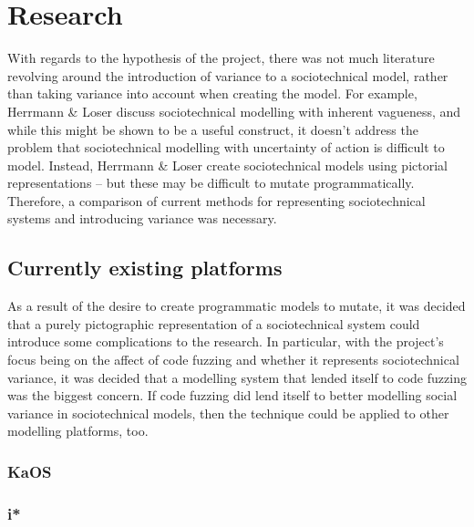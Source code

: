 \chapter{Research}
\label{research_head}
With regards to the hypothesis of the project, there was not much literature revolving around the introduction of variance to a sociotechnical model, rather than taking variance into account when creating the model. For example, Herrmann \& Loser\cite{Herrmann1999} discuss sociotechnical modelling with inherent vagueness, and while this might be shown to be a useful construct, it doesn't address the problem that sociotechnical modelling with uncertainty of action is difficult to model. Instead, Herrmann & Loser create sociotechnical models using pictorial representations -- but these may be difficult to mutate programmatically. Therefore, a comparison of current methods for representing sociotechnical systems and introducing variance was necessary. \par

\section{Currently existing platforms}
As a result of the desire to create programmatic models to mutate, it was decided that a purely pictographic representation of a sociotechnical system could introduce some complications to the research. In particular, with the project's focus being on the affect of code fuzzing and whether it represents sociotechnical variance, it was decided that a modelling system that lended itself to code fuzzing was the biggest concern. If code fuzzing did lend itself to better modelling social variance in sociotechnical models, then the technique could be applied to other modelling platforms, too. \par

\subsection{KaOS} %

\subsection{i*} %

